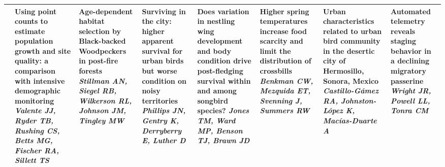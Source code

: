 \begin{tabular}{|x{0.85cm}|x{2.85cm}|x{2.85cm}|x{2.85cm}|x{2.85cm}|x{2.85cm}|a{2.85cm}|x{2.85cm}|}
&Using point counts to estimate population growth and site quality: a comparison with intensive demographic monitoring \newline \newline \textit{Valente JJ, Ryder TB, Rushing CS, Betts MG, Fischer RA, Sillett TS} & Age-dependent habitat selection by Black-backed Woodpeckers in post-fire forests \newline \newline \textit{Stillman AN, Siegel RB, Wilkerson RL, Johnson JM, Tingley MW} & Surviving in the city: higher apparent survival for urban birds but worse condition on noisy territories \newline \newline \textit{Phillips JN, Gentry K, Derryberry E, Luther D} & Does variation in nestling wing development and body condition drive post-fledging survival within and among songbird species? \newline \newline \textit{Jones TM, Ward MP, Benson TJ, Brawn JD} & Higher spring temperatures increase food scarcity and limit the distribution of crossbills \newline \newline \textit{Benkman CW, Mezquida ET, Svenning J, Summers RW} & Urban characteristics related to urban bird community in the desertic city of Hermosillo, Sonora, Mexico \newline \newline \textit{Castillo-G\'{a}mez RA, Johnston-L\'{o}pez K, Mac\'{i}as-Duarte A} & Automated telemetry reveals staging behavior in a declining migratory passerine \newline \newline \textit{Wright JR, Powell LL, Tonra CM}\\
\hline

\end{tabular}
